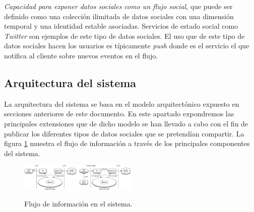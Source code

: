 \begin{itemize}
\textit{Capacidad para exponer datos sociales como un flujo social}, que puede ser definido como una colecci\'on ilimitada de datos sociales con una dimensi\'on temporal y una identidad estable asociadas. Servicios de estado social como \textit{Twitter} son ejemplos de este tipo de datos sociales. El uso que de este tipo de datos sociales hacen los usuarios es t\'ipicamente \textit{push} donde es el servicio el que notifica al cliente sobre nuevos eventos en el flujo. 
\end{itemize}

\subsection{Arquitectura del sistema}

La arquitectura del sistema se basa en el modelo arquitect\'onico expuesto en secciones anteriores de este documento. En este apartado expondremos las principales extensiones que de dicho modelo se han llevado a cabo con el fin de publicar los diferentes tipos de datos sociales que se pretend\'ian compartir. La figura \ref{figura5} muestra el flujo de informaci\'on a trav\'es de los principales componentes del sistema.\\

\begin{figure}
\vspace{2.4in}
\caption{Flujo de informaci\'on en el sistema.}
\includegraphics[width=0.5\textwidth]{figura5}
\label{figura5}
\end{figure}



